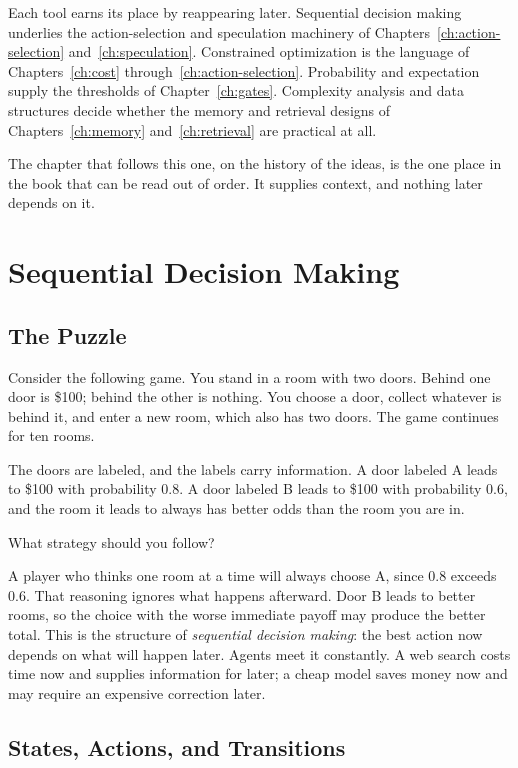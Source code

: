 \documentclass[11pt]{book}
\begin{document}
Each tool earns its place by reappearing later. Sequential decision making underlies the action-selection and speculation machinery of Chapters~\ref{ch:action-selection} and~\ref{ch:speculation}. Constrained optimization is the language of Chapters~\ref{ch:cost} through~\ref{ch:action-selection}. Probability and expectation supply the thresholds of Chapter~\ref{ch:gates}. Complexity analysis and data structures decide whether the memory and retrieval designs of Chapters~\ref{ch:memory} and~\ref{ch:retrieval} are practical at all.

The chapter that follows this one, on the history of the ideas, is the one place in the book that can be read out of order. It supplies context, and nothing later depends on it.

\section{Sequential Decision Making}

\subsection{The Puzzle}

Consider the following game. You stand in a room with two doors. Behind one door is \$100; behind the other is nothing. You choose a door, collect whatever is behind it, and enter a new room, which also has two doors. The game continues for ten rooms.

The doors are labeled, and the labels carry information. A door labeled A leads to \$100 with probability 0.8. A door labeled B leads to \$100 with probability 0.6, and the room it leads to always has better odds than the room you are in.

What strategy should you follow?

A player who thinks one room at a time will always choose A, since 0.8 exceeds 0.6. That reasoning ignores what happens afterward. Door B leads to better rooms, so the choice with the worse immediate payoff may produce the better total. This is the structure of \emph{sequential decision making}: the best action now depends on what will happen later. Agents meet it constantly. A web search costs time now and supplies information for later; a cheap model saves money now and may require an expensive correction later.

\subsection{States, Actions, and Transitions}
\end{document}
